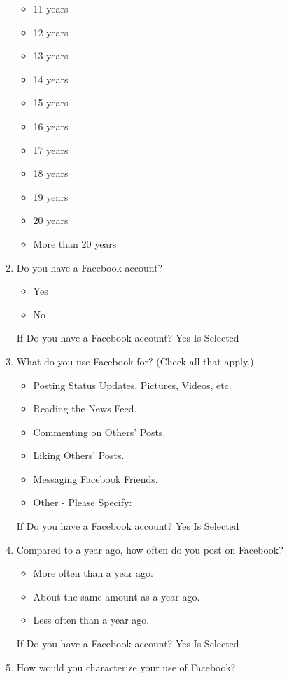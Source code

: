 \begin{enumerate}
\begin{itemize}
\item 11 years
\item 12 years
\item 13 years
\item 14 years
\item 15 years
\item 16 years
\item 17 years
\item 18 years
\item 19 years
\item 20 years
\item More than 20 years
\end{itemize}
\item Do you have a Facebook account?
\begin{itemize}
\item Yes
\item No
\end{itemize}
If Do you have a Facebook account? Yes Is Selected\\
\item What do you use Facebook for? (Check all that apply.)\\
\begin{itemize}
\item Posting Status Updates, Pictures, Videos, etc.
\item Reading the News Feed.
\item Commenting on Others' Posts.
\item Liking Others' Posts.
\item Messaging Facebook Friends.
\item Other - Please Specify:
\end{itemize}
If Do you have a Facebook account? Yes Is Selected\\
\item Compared to a year ago, how often do you post on Facebook?\\
\begin{itemize}
\item More often than a year ago.
\item About the same amount as a year ago.
\item Less often than a year ago.
\end{itemize}
If Do you have a Facebook account? Yes Is Selected\\
\item How would you characterize your use of Facebook?\\
\begin{itemize}

\end{itemize}
\end{enumerate}
